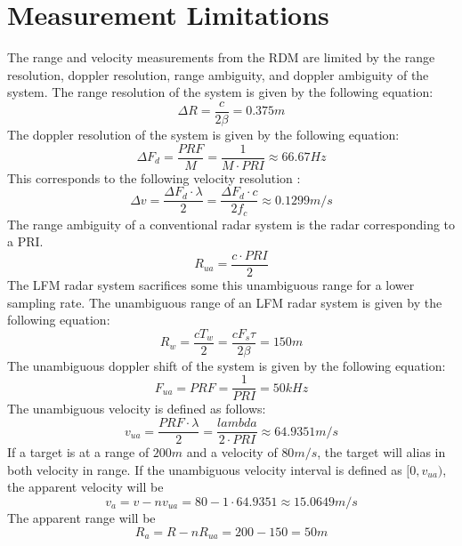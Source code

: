 \documentclass[conference]{IEEEtran}
\begin{document}
\section{Measurement Limitations}
The range and velocity measurements from the RDM are limited by the range resolution, doppler resolution, range ambiguity, and doppler ambiguity of the system. The range resolution of the system is given by the following equation:
\begin{equation}
\Delta R = \frac{c}{2\beta} = 0.375m
\end{equation}
The doppler resolution of the system is given by the following equation:
\begin{equation}
\Delta F_d = \frac{PRF}{M} = \frac{1}{M\cdot PRI} \approx 66.67Hz
\end{equation}
This corresponds to the following velocity resolution :
\begin{equation}
\Delta v = \frac{\Delta F_d \cdot \lambda}{2} = \frac{\Delta F_d \cdot c}{2f_c} \approx 0.1299 m/s
\end{equation}
The range ambiguity of a conventional radar system is the radar corresponding to a PRI. 
\begin{equation}
R_{ua} = \frac{c \cdot PRI}{2} 
\end{equation}
The LFM radar system sacrifices some this unambiguous range for a lower sampling rate. The unambiguous range of an LFM radar system is given by the following equation:
\begin{equation}
R_w = \frac{c T_w}{2} = \frac{c F_s \tau}{2\beta} = 150m
\end{equation}
The unambiguous doppler shift of the system is given by the following equation:
\begin{equation}
F_{ua} = PRF = \frac{1}{PRI} = 50kHz
\end{equation}
The unambiguous velocity is defined as follows:
\begin{equation}
v_{ua} = \frac{PRF\cdot\lambda}{2} = \frac{lambda}{2\cdot PRI} \approx 64.9351m/s 
\end{equation}
If a target is at a range of $200m$ and a velocity of $80m/s$, the target will alias in both velocity in range. If the unambiguous velocity interval is defined as $[0, v_{ua})$, the apparent velocity will be
\begin{equation}
v_a = v - nv_{ua} = 80 - 1 \cdot 64.9351 \approx 15.0649m/s
\end{equation}
The apparent range will be
\begin{equation}
R_a = R - nR_{ua} = 200 - 150 = 50m
\end{equation}
\end{document}
